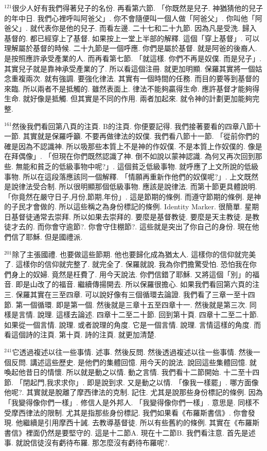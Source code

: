 \documentclass{book}
\begin{document}
$^{121}$很少人好有我們得著兒子的名份.
再看第六節.
「你既然是兒子.
神猶猜他的兒子的年中日.
我們心裡呼叫阿爸父」.
你不會隨便叫一個人做「阿爸父」.
你叫他「阿爸父」.
就代表你是他的兒子.
而看左邊.
二十七和二十九節.
因為凡是受洗.
歸入基督的.
都已經穿上了基督.
如果按上一堂上半部的解釋.
這個「穿上基督」.
可以理解屬於基督的時候.
二十九節是一個呼應.
你們是屬於基督.
就是阿爸的後裔人.
是按照應許承受產業的人.
而再看第七節.
「就這樣.
你們不再是奴僕.
而是兒子」.
其實兒子就是靠神承受產業的了.
所以看這個注冊.
就更加明顯.
保羅其實將一個姑念重複兩次.
就有強調.
要強化律法.
其實有一個時間的任務.
而目的要等到基督的來臨.
所以兩者不是抵觸的.
雖然表面上.
律法不能夠贏得生命.
應許基督才能夠得生命.
就好像是抵觸.
但其實是不同的作用.
兩者加起來.
就令神的計劃更加能夠完整.

$^{161}$然後我們看回第八頁的注頁.
B的注頁.
你便要記得.
我們接著要看的四章八節十一節.
其實就是保羅呼籲.
不要再做律法的奴僕.
我們看八節十一節.
「從前你們的確是因為不認識神.
所以吸那些本質上不是神的作奴僕.
不是本質上作奴僕的.
像是在拜偶像」.
「但現在你們既然認識了神.
倒不如說以蒙神認識.
為何又再次回到那些.
無能和貧乏的低級事物中呢?」.
這個貧乏低級事物.
就呼應了上文所說的低級事物.
所以在這段落應該同一個解釋.
「情願再重新作他們的奴僕呢?」.
上文既然是說律法受合制.
所以很明顯那個低級事物.
應該是說律法.
而第十節更具體說明.
「你竟然在嚴守日子,月份,節期,年份」.
這是節期的條例.
而遵守節期的條例.
是神的子民才會做的.
所以這些稱之為身份標記的條例.
Identity Marker.
很簡單.
星期日基督徒通常去崇拜.
所以如果去崇拜的.
要麼是基督教徒.
要麼是天主教徒.
是教徒才去的.
而你會守逾節?.
你會守住棚節?.
這些就是突出了你自己的身份.
現在他們信了耶穌.
但是國禮派.

$^{201}$除了主張國禮.
也要做這些節期.
他也要歸化成為猶太人.
這樣你的信仰就完美了.
這樣你的信仰就完整了.
就完全了.
保羅就說.
我為你們擔驚受怕.
恐怕我在你們身上的奴婦.
竟然是枉費了.
用今天說法.
你們信錯了耶穌.
又將這個「別」的福音.
即是山改了的福音.
繼續傳揚開去.
所以保羅很擔心.
如果我們看回第六頁的注三.
保羅其實在三至四章.
可以說好像有三個循環去論證.
我們看了三章一至十四節.
第一個循環.
即是第一個.
然後就是三章十五至四章十一.
然後就是第三次.
同樣是言情.
說理.
這樣去論述.
四章十二至二十節.
回到第十頁.
四章十二至二十節.
如果從一個言情.
說理.
或者說理的角度.
它是一個言情.
說理.
言情這樣的角度.
而看這個詩的注頁.
第十頁.
詩的注頁.
就更加清楚.

$^{241}$它透過複述以往一些事情.
述事.
然後反問.
然後透過複述以往一些事情.
然後一個反問.
講述這些歷史.
是他們的集體回憶.
用今天的說法.
說回這些集體回憶.
就喚起他昔日的情懷.
所以就是動之以情.
動之言情.
我們看十二節開始.
十二至十四節.
「閉起門,我求求你」.
即是說到求.
又是動之以情.
「像我一樣罷」.
哪方面像他呢?.
其實就是脫離了摩西律法的克制.
記住.
尤其是說那些身份標記的條例.
因為「我變得像你們一樣」.
修信人是外邦人.
「我變得像你們一樣」.
意思是.
同樣不受摩西律法的限制.
尤其是指那些身份標記.
我們如果看《布羅斯書信》.
你會發現.
他繼續是引用摩西十誡.
去教導基督徒.
所以有些舊約的條例.
其實在《布羅斯書信》裡面仍然是要堅守的.
這是十二節A.
現在十二節B.
我們看注意.
首先是述事.
就說信徒沒有虧待布羅.
那怎麼沒有虧待布羅呢?.
\end{document}

